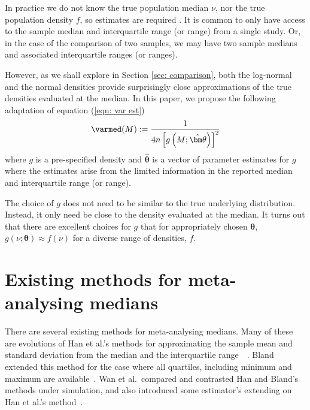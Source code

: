 \documentclass{article}
\begin{document}
In practice we do not know the true population median $\nu$, nor the true population density $f$, so estimates are required . It is common to only have access to the sample median and interquartile range (or range) from a single study. Or, in the case of the comparison of two samples, we may have two sample medians and associated interquartile ranges (or ranges).

However, as we shall explore in Section \ref{sec: comparison}, both the log-normal and the normal densities provide surprisingly close approximations of the true densities evaluated at the median.  In this paper, we propose the following adaptation of equation (\ref{eqn: var est})
\begin{equation} \label{eqn: varmed}
\varmed(M) := \frac 1 {4n\left[ g\left(M; \hat{\bm \theta}\right)\right]^2}
\end{equation}
where $g$ is a pre-specified density and $\hat{\bm \theta}$ is a vector of parameter estimates for $g$ where the estimates arise from the limited information in the reported median and interquartile range (or range).

\begin{remark}
The choice of $g$ does not need to be similar to the true underlying distribution.  Instead, it only need be close to the density evaluated at the median. It turns out that there are excellent choices for $g$ that for appropriately chosen $\bm{\theta}$, $g(\nu;\bm \theta)\approx f(\nu)$ for a diverse range of densities, $f$.
\end{remark}


\section{Existing methods for meta-analysing medians}

There are several existing methods for meta-analysing medians. Many of these are evolutions of Han et al.'s methods for approximating the sample mean and standard deviation from the median and the interquartile range~~. Bland extended this method for the case where all quartiles, including minimum and maximum are available~. Wan et al.\ compared and contrasted Han and Bland's methods under simulation, and also introduced some estimator's extending on Han et al.'s method~.
\end{document}

